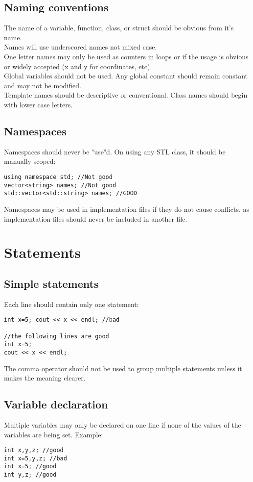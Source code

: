\documentclass[letterpaper,10pt]{article}
\begin{document}
\subsection{Naming conventions}
The name of a variable, function, class, or struct should be obvious from it's name.\\
Names will use underscored names not mixed case.\\
One letter names may only be used as counters in loops or if the usage is obvious or widely accepted (x and y for coordinates, etc).\\
Global variables should not be used. Any global constant should remain constant and may not be modified.\\
Template names should be descriptive or conventional.
Class names should begin with lower case letters.
\subsection{Namespaces}
Namespaces should never be "use"d.  On using any STL class, it should be manually scoped:
\begin{verbatim}
using namespace std; //Not good
vector<string> names; //Not good
std::vector<std::string> names; //GOOD
\end{verbatim}
Namespaces may be used in implementation files if they do not cause conflicts, as implementation files should never be included in another file.
\section{Statements}
\subsection{Simple statements}
Each line should contain only one statement:
\begin{verbatim}
int x=5; cout << x << endl; //bad

//the following lines are good
int x=5;
cout << x << endl;
\end{verbatim}
The comma operator should not be used to group multiple statements unless it makes the meaning clearer.
\subsection{Variable declaration}
Multiple variables may only be declared on one line if none of the values of the variables are being set. Example:
\begin{verbatim}
int x,y,z; //good
int x=5,y,z; //bad
int x=5; //good
int y,z; //good
\end{verbatim}
\end{document}
